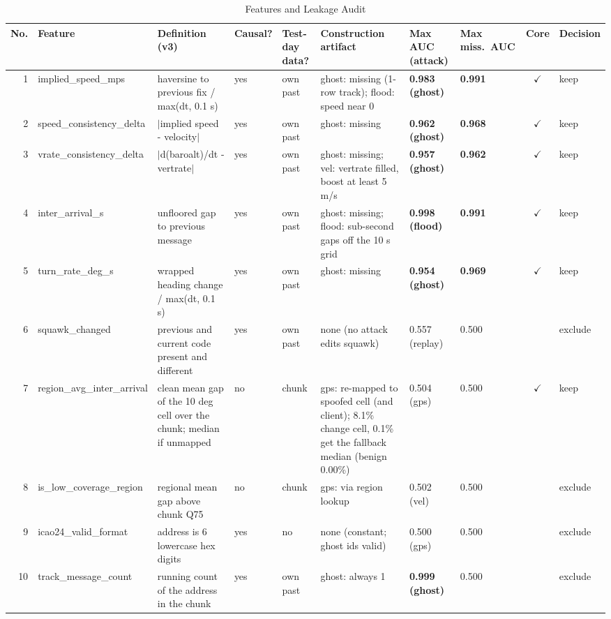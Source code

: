 \begin{table}[t]
\caption{Features and Leakage Audit}\label{tab:audit}
\centering\scriptsize
\setlength{\tabcolsep}{3pt}
\begin{tabularx}{\textwidth}{r l >{\raggedright\arraybackslash}X l l >{\raggedright\arraybackslash}X l l c l}\toprule
No. & Feature & Definition (v3) & Causal? & Test-day data? & Construction artifact & Max AUC (attack) & Max miss.\ AUC & Core & Decision \\\midrule
1 & implied\_speed\_mps & haversine to previous fix / max(dt, 0.1 s) & yes & own past & ghost: missing (1-row track); flood: speed near 0 & \textbf{0.983 (ghost)} & \textbf{0.991} & $\checkmark$ & keep \\
2 & speed\_consistency\_delta & $|$implied speed - velocity$|$ & yes & own past & ghost: missing & \textbf{0.962 (ghost)} & \textbf{0.968} & $\checkmark$ & keep \\
3 & vrate\_consistency\_delta & $|$d(baroalt)/dt - vertrate$|$ & yes & own past & ghost: missing; vel: vertrate filled, boost at least 5 m/s & \textbf{0.957 (ghost)} & \textbf{0.962} & $\checkmark$ & keep \\
4 & inter\_arrival\_s & unfloored gap to previous message & yes & own past & ghost: missing; flood: sub-second gaps off the 10 s grid & \textbf{0.998 (flood)} & \textbf{0.991} & $\checkmark$ & keep \\
5 & turn\_rate\_deg\_s & wrapped heading change / max(dt, 0.1 s) & yes & own past & ghost: missing & \textbf{0.954 (ghost)} & \textbf{0.969} & $\checkmark$ & keep \\
6 & squawk\_changed & previous and current code present and different & yes & own past & none (no attack edits squawk) & 0.557 (replay) & 0.500 &  & exclude \\
7 & region\_avg\_inter\_arrival & clean mean gap of the 10 deg cell over the chunk; median if unmapped & no & chunk & gps: re-mapped to spoofed cell (and client); 8.1\% change cell, 0.1\% get the fallback median (benign 0.00\%) & 0.504 (gps) & 0.500 & $\checkmark$ & keep \\
8 & is\_low\_coverage\_region & regional mean gap above chunk Q75 & no & chunk & gps: via region lookup & 0.502 (vel) & 0.500 &  & exclude \\
9 & icao24\_valid\_format & address is 6 lowercase hex digits & yes & no & none (constant; ghost ids valid) & 0.500 (gps) & 0.500 &  & exclude \\
10 & track\_message\_count & running count of the address in the chunk & yes & own past & ghost: always 1 & \textbf{0.999 (ghost)} & 0.500 &  & exclude \\

\end{tabularx}
\end{table}
